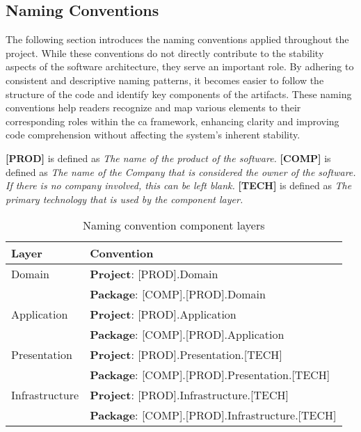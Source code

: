 \subsection{Naming Conventions} \label{appendix_component_naming_convention}

The following section introduces the naming conventions applied throughout the project.
While these conventions do not directly contribute to the stability aspects of the
software architecture, they serve an important role. By adhering to consistent and
descriptive naming patterns, it becomes easier to follow the structure of the code and
identify key components of the artifacts. These naming conventions help readers recognize
and map various elements to their corresponding roles within the \gls{ca} framework,
enhancing clarity and improving code comprehension without affecting the system's inherent
stability.

\textbf{[PROD]} is defined as \textit{The name of the product of the software.} \newline 
\textbf{[COMP]} is defined as \textit{The name of the Company that is considered the owner of the software. If
there is no company involved, this can be left blank.} \newline 
\textbf{[TECH]} is defined as \textit{The primary technology that is used by the component layer.} 

\begin{table}[H]
  \renewcommand{\arraystretch}{1.5}
    \footnotesize
    \caption{Naming convention component layers}
    \begin{tabular}{ l l }
    \hline
    \textbf{Layer} & \textbf{Convention} \\ 
    \hline
    Domain & \textbf{Project}: [PROD].Domain \\ & \textbf{Package}: [COMP].[PROD].Domain \\
    Application & \textbf{Project}: [PROD].Application \\ & \textbf{Package}: [COMP].[PROD].Application \\
    Presentation & \textbf{Project}: [PROD].Presentation.[TECH] \\ & \textbf{Package}: [COMP].[PROD].Presentation.[TECH] \\
    Infrastructure & \textbf{Project}: [PROD].Infrastructure.[TECH] \\ & \textbf{Package}: [COMP].[PROD].Infrastructure.[TECH]
    \\ \hline
    \end{tabular}

\label{table:component_naming_convention}
\end{table}

